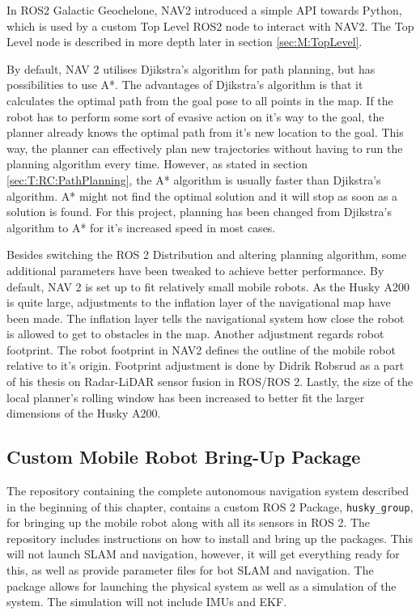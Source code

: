 In ROS2 Galactic Geochelone, NAV2 introduced a simple API towards Python, which is used by a custom Top Level ROS2 node to interact with NAV2. The Top Level node is described in more depth later in section \ref{sec:M:TopLevel}.

By default, NAV 2 utilises Djikstra's algorithm for path planning, but has possibilities to use A*. The advantages of Djikstra's algorithm is that it calculates the optimal path from the goal pose to all points in the map. If the robot has to perform some sort of evasive action on it's way to the goal, the planner already knows the optimal path from it's new location to the goal. This way, the planner can effectively plan new trajectories without having to run the planning algorithm every time. However, as stated in section \ref{sec:T:RC:PathPlanning}, the A* algorithm is usually faster than Djikstra's algorithm. A* might not find the optimal solution and it will stop as soon as a solution is found. For this project, planning has been changed from Djikstra's algorithm to A* for it's increased speed in most cases.

Besides switching the ROS 2 Distribution and altering planning algorithm, some additional parameters have been tweaked to achieve better performance. By default, NAV 2 is set up to fit relatively small mobile robots. As the Husky A200 is quite large, adjustments to the inflation layer of the navigational map have been made. The inflation layer tells the navigational system how close the robot is allowed to get to obstacles in the map. Another adjustment regards robot footprint. The robot footprint in NAV2 defines the outline of the mobile robot relative to it's origin. Footprint adjustment is done by Didrik Robsrud as a part of his thesis on Radar-LiDAR sensor fusion in ROS/ROS 2\cite{robsrud2023}. Lastly, the size of the local planner's rolling window has been increased to better fit the larger dimensions of the Husky A200.

\subsection{Custom Mobile Robot Bring-Up Package} \label{sec:M:AN:CustomMRBringup}
The repository containing the complete autonomous navigation system described in the beginning of this chapter, contains a custom ROS 2 Package, \lstinline{husky_group}, for bringing up the mobile robot along with all its sensors in ROS 2. The repository includes instructions on how to install and bring up the packages. This will not launch SLAM and navigation, however, it will get everything ready for this, as well as provide parameter files for bot SLAM and navigation. The package allows for launching the physical system as well as a simulation of the system. The simulation will not include IMUs and EKF. 

